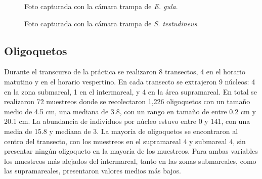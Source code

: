 \documentclass[
  authoryear,
  preprint,
  3p,
  twocolumn]{elsarticle}
\begin{document}
\begin{figure}


\caption{\label{fig-3}Foto capturada con la cámara trampa de \emph{E.
gula}.}

\end{figure}%

\begin{figure}


\caption{\label{fig-4}Foto capturada con la cámara trampa de \emph{S.
testudineus}.}

\end{figure}%

\subsection{Oligoquetos}\label{oligoquetos-1}

Durante el transcurso de la práctica se realizaron 8 transectos, 4 en el
horario matutino y en el horario vespertino. En cada transecto se
extrajeron 9 núcleos: 4 en la zona submareal, 1 en el intermareal, y 4
en la área supramareal. En total se realizaron 72 muestreos donde se
recolectaron 1,226 oligoquetos con un tamaño medio de 4.5 cm, una
mediana de 3.8, con un rango en tamaño de entre 0.2 cm y 20.1 cm. La
abundancia de individuos por núcleo estuvo entre 0 y 141, con una media
de 15.8 y mediana de 3. La mayoría de oligoquetos se encontraron al
centro del transecto, con los muestreos en el supramareal 4 y submareal
4, sin presentar ningún oligoqueto en la mayoría de los muestreos. Para
ambas variables los muestreos más alejados del intermareal, tanto en las
zonas submareales, como las supramareales, presentaron valores medios
más bajos.
\end{document}

